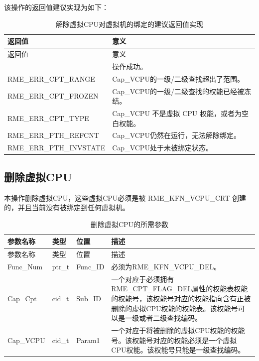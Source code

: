 该操作的返回值建议实现为如下：

\begin{xltabular}{\textwidth}{@{}>{\hsize\raggedright\arraybackslash}X>{\hsize\raggedright\arraybackslash}X@{}}
\caption{解除虚拟CPU对虚拟机的绑定的建议返回值实现}\label{tab:8-86-unbind-virtual-cpu-from-virtual-machine-suggested-return-values}\\
\toprule
返回值 & 意义\tabularnewline
\endfirsthead
\toprule
返回值 & 意义\tabularnewline
\midrule
\endhead
\bottomrule
{} & 操作成功。\tabularnewline
    RME\_ERR\_CPT\_RANGE & Cap\_VCPU的一级/二级查找超出了范围。\tabularnewline
    RME\_ERR\_CPT\_FROZEN & Cap\_VCPU的一级/二级查找的权能已经被冻结。\tabularnewline
    RME\_ERR\_CPT\_TYPE & Cap\_VCPU 不是虚拟 CPU 权能，或者为空白权能。\tabularnewline
    RME\_ERR\_PTH\_REFCNT & Cap\_VCPU仍然在运行，无法解除绑定。\tabularnewline
    RME\_ERR\_PTH\_INVSTATE & Cap\_VCPU处于未被绑定状态。\tabularnewline
\end{xltabular}

\subsection{删除虚拟CPU}\label{subsec:8-delete-virtual-cpu}

本操作删除虚拟CPU，这些虚拟CPU必须是被 RME\_KFN\_VCPU\_CRT 创建的，并且当前没有被绑定到任何虚拟机。

\begin{xltabular}{\textwidth}{@{}>{\hsize\raggedright\arraybackslash}X>{\hsize\raggedright\arraybackslash}X>{\hsize\raggedright\arraybackslash}X>{\hsize\raggedright\arraybackslash}X@{}}
\caption{删除虚拟CPU的所需参数}\label{tab:8-87-delete-virtual-cpu-parameters}\\
\toprule
参数名称 & 类型 & 位置 & 描述\tabularnewline
\endfirsthead
\toprule
参数名称 & 类型 & 位置 & 描述\tabularnewline
\midrule
\endhead
\bottomrule
\endlastfoot
Func\_Num & ptr\_t & Func\_ID &
必须为RME\_KFN\_VCPU\_DEL。\tabularnewline
Cap\_Cpt & cid\_t & Sub\_ID &
一个对应于必须拥有RME\_CPT\_FLAG\_DEL属性的权能表权能的权能号，该权能号对应的权能指向含有正被删除的虚拟CPU权能的权能表。该权能号可以是一级或者二级查找编码。\tabularnewline
Cap\_VCPU & cid\_t & Param1 &
一个对应于将被删除的虚拟CPU权能的权能号。该权能号对应的权能必须是一个虚拟CPU权能。该权能号只能是一级查找编码。\tabularnewline
\end{xltabular}

